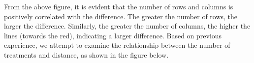 \documentclass[
  a4paper,
  oneside,
  openany,
  12pt,
  onecolumn]{book}
\theoremstyle{plain}
\theoremstyle{definition}
\theoremstyle{remark}
\begin{document}
\begin{figure}


\caption{\label{fig-align}}

\end{figure}%

From the above figure, it is evident that the number of rows and columns
is positively correlated with the difference. The greater the number of
rows, the larger the difference. Similarly, the greater the number of
columns, the higher the lines (towards the red), indicating a larger
difference. Based on previous experience, we attempt to examine the
relationship between the number of treatments and distance, as shown in
the figure below.
\end{document}
